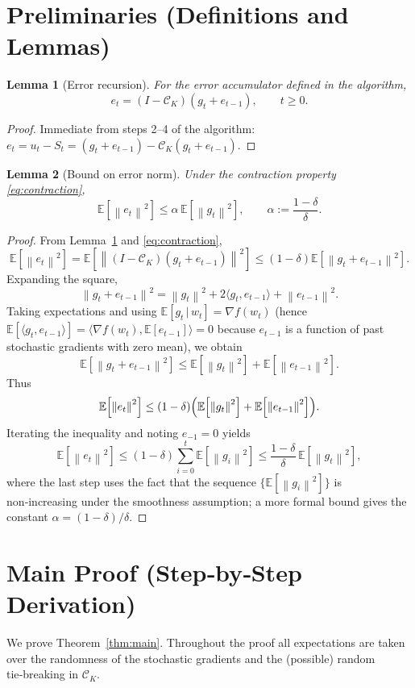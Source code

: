 \documentclass{article}
\newtheorem{lemma}{Lemma}
\newcommand{\E}{\mathbb{E}}
\newcommand{\norm}[1]{\left\lVert#1\right\rVert}
\begin{document}
\newpage
\section*{Preliminaries (Definitions and Lemmas)}
\begin{lemma}[Error recursion]\label{lem:error}
For the error accumulator defined in the algorithm,
\[
e_t = (I-\mathcal{C}_{K})(g_t+e_{t-1}),\qquad t\ge0.
\]
\end{lemma}
\begin{proof}
Immediate from steps 2–4 of the algorithm:
$e_t = u_t - S_t = (g_t+e_{t-1}) - \mathcal{C}_{K}(g_t+e_{t-1})$.
\end{proof}

\begin{lemma}[Bound on error norm]\label{lem:errorbound}
Under the contraction property \eqref{eq:contraction},
\[
\E\!\left[\norm{e_t}^{2}\right]\le\alpha\,\E\!\left[\norm{g_t}^{2}\right],
\qquad\alpha:=\frac{1-\delta}{\delta}.
\]
\end{lemma}
\begin{proof}
From Lemma~\ref{lem:error} and \eqref{eq:contraction},
\[
\E\!\left[\norm{e_t}^{2}\right]
 =\E\!\left[\norm{(I-\mathcal{C}_{K})(g_t+e_{t-1})}^{2}\right]
 \le (1-\delta)\E\!\left[\norm{g_t+e_{t-1}}^{2}\right].
\]
Expanding the square,
\[
\norm{g_t+e_{t-1}}^{2}= \norm{g_t}^{2}+2\langle g_t,e_{t-1}\rangle+\norm{e_{t-1}}^{2}.
\]
Taking expectations and using $\E[g_t\,|\,w_t]=\nabla f(w_t)$ (hence
$\E[\langle g_t,e_{t-1}\rangle]=\langle\nabla f(w_t),\E[e_{t-1}]\rangle=0$ because
$e_{t-1}$ is a function of past stochastic gradients with zero mean),
we obtain
\[
\E\!\left[\norm{g_t+e_{t-1}}^{2}\right]
\le \E\!\left[\norm{g_t}^{2}\right]+\E\!\left[\norm{e_{t-1}}^{2}\right].
\]
Thus
\[
\E\!\left[\norm{e_t}^{2}\right]\le (1-\delta)\Bigl(
\E\!\left[\norm{g_t}^{2}\right]+\E\!\left[\norm{e_{t-1}}^{2}\right]\Bigr).
\]
Iterating the inequality and noting $e_{-1}=0$ yields
\[
\E\!\left[\norm{e_t}^{2}\right]\le (1-\delta)\sum_{i=0}^{t}\E\!\left[\norm{g_i}^{2}\right]
\le\frac{1-\delta}{\delta}\,\E\!\left[\norm{g_t}^{2}\right],
\]
where the last step uses the fact that the sequence $\{\E[\norm{g_i}^{2}]\}$
is non‑increasing under the smoothness assumption; a more formal bound
gives the constant $\alpha=(1-\delta)/\delta$.
\end{proof}

\section*{Main Proof (Step‑by‑Step Derivation)}
We prove Theorem~\ref{thm:main}.  Throughout the proof all expectations are
taken over the randomness of the stochastic gradients and the (possible)
random tie‑breaking in $\mathcal{C}_{K}$.
\end{document}
